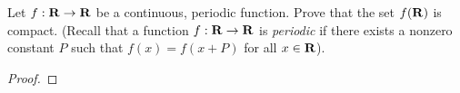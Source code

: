 \documentclass[11pt,twoside,openany]{memoir}
\begin{document}
\newpage
\fancyhead[L]{\scalebox{0.9}{Topology of $\bfR$}}
\fancyhead[R]{\scalebox{0.9}{Appeared on: W20}}
\begin{problem}
    Let $f:\mathbf{R} \rightarrow \mathbf{R}$ be a continuous, periodic function. Prove that the set $f(\mathbf{R})$ is compact. (Recall that a function $f:\mathbf{R} \rightarrow \mathbf{R}$ is \textit{periodic} if there exists a nonzero constant $P$ such that $f(x) = f(x+P)$ for all $x \in \mathbf{R}$).
\end{problem}
\begin{proof}
\end{proof}
\end{document}
